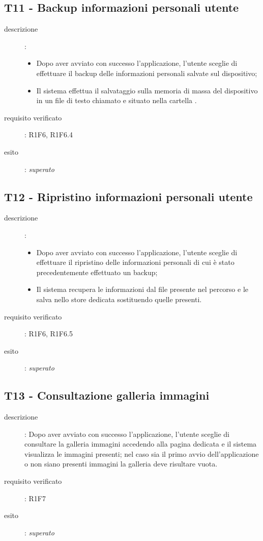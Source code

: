\subsection{T11 - Backup informazioni personali utente}
\begin{description}
\item[descrizione]: \hfill
	\begin{itemize}
	\item Dopo aver avviato con successo l'applicazione, l'utente sceglie di effettuare il backup delle informazioni personali salvate sul dispositivo;
	\item Il sistema effettua il salvataggio sulla memoria di massa del dispositivo in un file di testo chiamato  e situato nella cartella .
	\end{itemize}
\item[requisito verificato]: R1F6, R1F6.4
\item[esito]: \emph{superato}
\end{description}

\subsection{T12 - Ripristino informazioni personali utente}
\begin{description}
\item[descrizione]: \hfill
	\begin{itemize}
	\item Dopo aver avviato con successo l'applicazione, l'utente sceglie di effettuare il ripristino delle informazioni personali di cui è stato precedentemente effettuato un backup;
	\item Il sistema recupera le informazioni dal file presente nel percorso  e le salva nello store dedicata sostituendo quelle presenti.
	\end{itemize}
\item[requisito verificato]: R1F6, R1F6.5
\item[esito]: \emph{superato}
\end{description}

\subsection{T13 - Consultazione galleria immagini}
\begin{description}
\item[descrizione]: Dopo aver avviato con successo l'applicazione, l'utente sceglie di consultare la galleria immagini accedendo alla pagina dedicata e il sistema visualizza le immagini presenti; nel caso sia il primo avvio dell'applicazione o non siano presenti immagini la galleria deve risultare vuota.
\item[requisito verificato]: R1F7
\item[esito]: \emph{superato}
\end{description}

